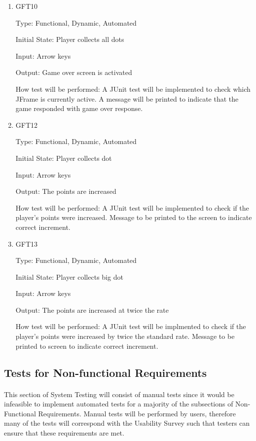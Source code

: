 \documentclass[12pt, titlepage]{article}
\begin{document}
\begin{enumerate}

\item{GFT10\\}

Type: Functional, Dynamic, Automated
					
Initial State: Player collects all dots
					
Input: Arrow keys
					
Output: Game over screen is activated

How test will be performed: A JUnit test will be implemented to check which JFrame is currently active. A message will be printed to indicate that the game responded with game over response.

\item{GFT12\\}

Type: Functional, Dynamic, Automated
					
Initial State: Player collects dot
					
Input: Arrow keys
					
Output: The points are increased

How test will be performed: A JUnit test will be implemented to check if the player's points were increased. Message to be printed to the screen to indicate correct increment.

\item{GFT13\\}

Type: Functional, Dynamic, Automated
					
Initial State: Player collects big dot
					
Input: Arrow keys
					
Output: The points are increased at twice the rate

How test will be performed: A JUnit test will be implmented to check if the player's points were increased by twice the standard rate. Message to be printed to screen to indicate correct increment.

\end{enumerate}

\subsection{Tests for Non-functional Requirements}

\paragraph{}
This section of System Testing will consist of manual tests since it would be infeasible to implement automated tests for a majority of the subsections of Non-Functional Requirements. Manual tests will be performed by users, therefore many of the tests will correspond with the Usability Survey such that testers can ensure that these requirements are met.
\end{document}
